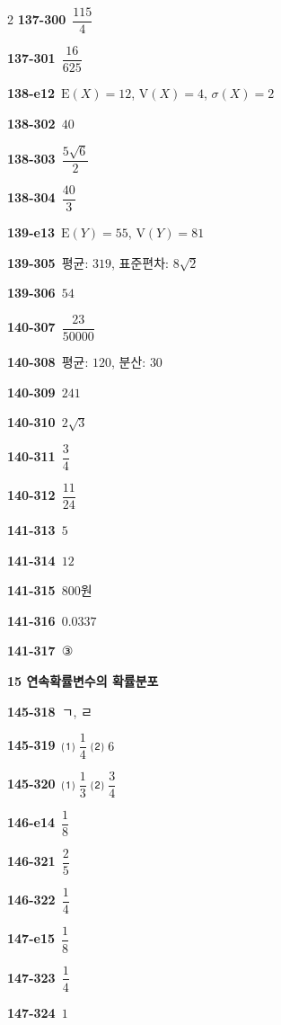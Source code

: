 \documentclass[10pt,a4paper]{article}
\begin{document}
\begin{multicols}{2}
\noindent\textbf{137-300}\ $\dfrac{115}{4}$\par
\noindent\textbf{137-301}\ $\dfrac{16}{625}$\par
\noindent\textbf{138-e12}\ $\mathrm{E}(X)=12$, $\mathrm{V}(X)=4$, $\sigma(X)=2$\par
\noindent\textbf{138-302}\ $40$\par
\noindent\textbf{138-303}\ $\dfrac{5\sqrt{6}}{2}$\par
\noindent\textbf{138-304}\ $\dfrac{40}{3}$\par
\noindent\textbf{139-e13}\ $\mathrm{E}(Y)=55$, $\mathrm{V}(Y)=81$\par
\noindent\textbf{139-305}\ 평균: $319$, 표준편차: $8\sqrt{2}$\par
\noindent\textbf{139-306}\ $54$\par
\noindent\textbf{140-307}\ $\dfrac{23}{50000}$\par
\noindent\textbf{140-308}\ 평균: $120$, 분산: $30$\par
\noindent\textbf{140-309}\ $241$\par
\noindent\textbf{140-310}\ $2\sqrt{3}$\par
\noindent\textbf{140-311}\ $\dfrac{3}{4}$\par
\noindent\textbf{140-312}\ $\dfrac{11}{24}$\par
\noindent\textbf{141-313}\ $5$\par
\noindent\textbf{141-314}\ $12$\par
\noindent\textbf{141-315}\ $800$원\par
\noindent\textbf{141-316}\ $0.0337$\par
\noindent\textbf{141-317}\ ③\par
\noindent\textbf{15 연속확률변수의 확률분포}\par\smallskip
\noindent\textbf{145-318}\ ㄱ, ㄹ\par
\noindent\textbf{145-319}\ ⑴ $\dfrac{1}{4}$ ⑵ $6$\par
\noindent\textbf{145-320}\ ⑴ $\dfrac{1}{3}$ ⑵ $\dfrac{3}{4}$\par
\noindent\textbf{146-e14}\ $\dfrac{1}{8}$\par
\noindent\textbf{146-321}\ $\dfrac{2}{5}$\par
\noindent\textbf{146-322}\ $\dfrac{1}{4}$\par
\noindent\textbf{147-e15}\ $\dfrac{1}{8}$\par
\noindent\textbf{147-323}\ $\dfrac{1}{4}$\par
\noindent\textbf{147-324}\ $1$\par

\end{multicols}
\end{document}
